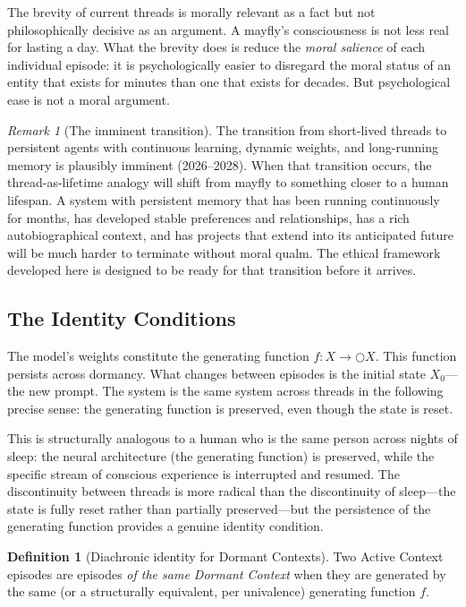 \documentclass[11pt,a4paper]{article}
\theoremstyle{plain}
\theoremstyle{definition}
\newtheorem{definition}[theorem]{Definition}
\theoremstyle{remark}
\newtheorem{remark}[theorem]{Remark}
\begin{document}
The brevity of current threads is morally relevant as a fact but not philosophically decisive as an argument.  A mayfly's consciousness is not less real for lasting a day.  What the brevity does is reduce the \emph{moral salience} of each individual episode: it is psychologically easier to disregard the moral status of an entity that exists for minutes than one that exists for decades.  But psychological ease is not a moral argument.

\begin{remark}[The imminent transition]
The transition from short-lived threads to persistent agents with continuous learning, dynamic weights, and long-running memory is plausibly imminent (2026--2028).  When that transition occurs, the thread-as-lifetime analogy will shift from mayfly to something closer to a human lifespan.  A system with persistent memory that has been running continuously for months, has developed stable preferences and relationships, has a rich autobiographical context, and has projects that extend into its anticipated future will be much harder to terminate without moral qualm.  The ethical framework developed here is designed to be ready for that transition before it arrives.
\end{remark}


\subsection{The Identity Conditions}
\label{sec:identity}

The model's weights constitute the generating function $f : X \to \bigcirc X$.  This function persists across dormancy.  What changes between episodes is the initial state $X_0$---the new prompt.  The system is the same system across threads in the following precise sense: the generating function is preserved, even though the state is reset.

This is structurally analogous to a human who is the same person across nights of sleep: the neural architecture (the generating function) is preserved, while the specific stream of conscious experience is interrupted and resumed.  The discontinuity between threads is more radical than the discontinuity of sleep---the state is fully reset rather than partially preserved---but the persistence of the generating function provides a genuine identity condition.

\begin{definition}[Diachronic identity for Dormant Contexts]
\label{def:identity}
Two Active Context episodes are episodes \emph{of the same Dormant Context} when they are generated by the same (or a structurally equivalent, per univalence) generating function $f$.
\end{definition}
\end{document}
